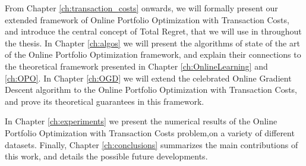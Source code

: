From Chapter \ref{ch:transaction_costs} onwards, we will formally present our extended framework of Online Portfolio Optimization with Transaction Costs, and introduce the central concept of Total Regret, that we will use in throughout the thesis. In Chapter \ref{ch:algos} we will present the algorithms of  state of the art of the Online Portfolio Optimization framework, and explain their connections to the theoretical framework presented in Chapter \ref{ch:OnlineLearning} and \ref{ch:OPO}. In Chapter \ref{ch:OGD} we will extend the celebrated Online Gradient Descent algorithm to the Online Portfolio Optimization with Transaction Costs, and prove its theoretical guarantees in this framework.

In Chapter \ref{ch:experiments} we present the numerical results of the Online Portfolio Optimization with Transaction Costs problem,on a variety of different datasets. Finally, Chapter \ref{ch:conclusions} summarizes the main contributions of this work, and details the possible future developments.
